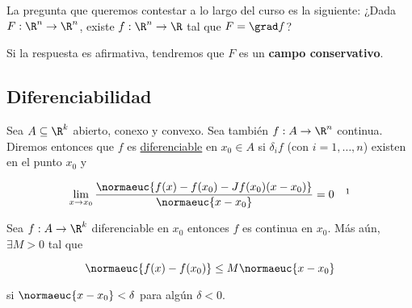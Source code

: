\begin{pre}
    La pregunta que queremos contestar a lo largo del curso es la siguiente: ¿Dada $F: \R^n \rightarrow \R^n$, existe $f: \R^n \rightarrow \R$ tal que $F = \grad f$?
    
    Si la respuesta es afirmativa, tendremos que $F$ es un \textbf{campo conservativo}.
\end{pre}

\subsection{Diferenciabilidad}

\begin{defn}
    Sea $A \subseteq \R^k$ abierto, conexo y convexo. Sea también $f: A \rightarrow \R^n$ continua. Diremos entonces que $f$ es \ul{diferenciable} en $x_0 \in A$ si $\delta_i f$ (con $i = 1, \dots, n$) existen en el punto $x_0$ y 
    
    \[
    \lim_{x \to x_0} \frac{\normaeuc{f(x) - f(x_0) - Jf(x_0)(x - x_0)}}{\normaeuc{x - x_0}} = 0 \quad \footnotemark
    \]
\end{defn}

\begin{teo}
    Sea $f: A \rightarrow \R^k$ diferenciable en $x_0$ entonces $f$ es continua en $x_0$. Más aún, $\exists M > 0$ tal que
    
    \[
    \normaeuc{f(x) - f(x_0)} \leq M \normaeuc{x - x_0}
    \]
    
    \noindent si $\normaeuc{x - x_0} < \delta$ para algún $\delta < 0$.
\end{teo}

